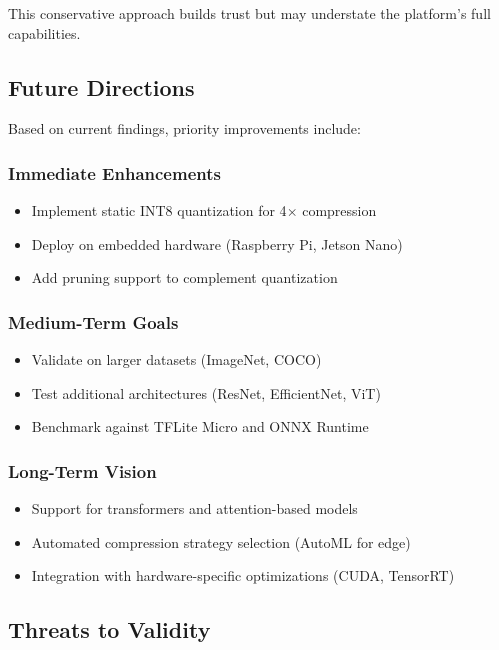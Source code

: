 This conservative approach builds trust but may understate the platform's full capabilities.

\subsection{Future Directions}

Based on current findings, priority improvements include:

\subsubsection{Immediate Enhancements}
\begin{itemize}
\item Implement static INT8 quantization for 4$\times$ compression
\item Deploy on embedded hardware (Raspberry Pi, Jetson Nano)
\item Add pruning support to complement quantization
\end{itemize}

\subsubsection{Medium-Term Goals}
\begin{itemize}
\item Validate on larger datasets (ImageNet, COCO)
\item Test additional architectures (ResNet, EfficientNet, ViT)
\item Benchmark against TFLite Micro and ONNX Runtime
\end{itemize}

\subsubsection{Long-Term Vision}
\begin{itemize}
\item Support for transformers and attention-based models
\item Automated compression strategy selection (AutoML for edge)
\item Integration with hardware-specific optimizations (CUDA, TensorRT)
\end{itemize}

\subsection{Threats to Validity}

